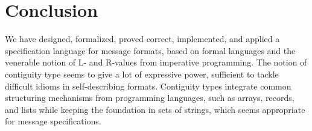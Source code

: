 \documentclass[a4paper,UKenglish,cleveref, autoref, thm-restate]{lipics-v2021}
\begin{document}
\section{Conclusion}

 We have designed, formalized, proved correct, implemented, and applied
a specification language for message formats, based on formal
languages and the venerable notion of L- and R-values from imperative
programming. The notion of contiguity type seems to give a lot of
expressive power, sufficient to tackle difficult idioms in
self-describing formats. Contiguity types integrate common structuring
mechanisms from programming languages, such as arrays, records, and
lists while keeping the foundation in sets of strings, which seems
appropriate for message specifications.


\end{document}
